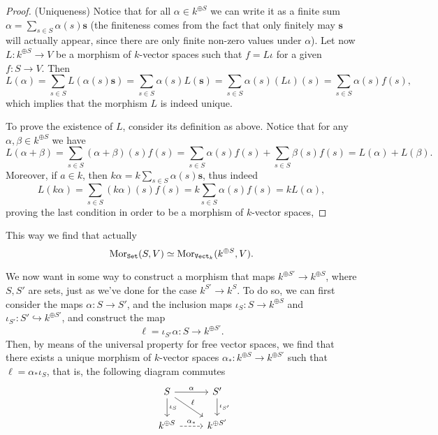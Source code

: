 \begin{proof}
(Uniqueness) Notice that for all \(\alpha \in k^{\oplus S}\) we can write it
as a finite sum \(\alpha = \sum_{s \in S}\alpha(s) \mathbf s\) (the
finiteness comes from the fact that only finitely may \(\mathbf s\) will
actually appear, since there are only finite non-zero values under
\(\alpha\)). Let now  \(L : k^{\oplus S} \to V\) be a morphism of
\(k\)-vector spaces such that \(f = L  \iota\) for a given \(f : S \to
V\). Then
\[
  L(\alpha) = \sum_{s \in S} L(\alpha(s) \mathbf{s}) = \sum_{s \in S}
  \alpha(s) L(\mathbf s) = \sum_{s \in S} \alpha(s) (L  \iota)(s)
  = \sum_{s \in S} \alpha(s) f(s),
\]
which implies that the morphism \(L\) is indeed unique.

To prove the existence of \(L\), consider its definition as above. Notice
that for any \(\alpha, \beta \in k^{\oplus S}\) we have
\[
  L(\alpha + \beta) = \sum_{s \in S} (\alpha + \beta)(s) f(s) = \sum_{s \in
  S} \alpha(s)f(s) + \sum_{s \in S} \beta(s)f(s) = L(\alpha) + L(\beta).
\]
Moreover, if \(a \in k\), then \(k \alpha = k\sum_{s \in S} \alpha(s)
\mathbf s\), thus indeed
\[
  L(k \alpha) = \sum_{s \in S} (k \alpha)(s) f(s) = k \sum_{s \in S}
  \alpha(s) f(s) = k L(\alpha),
\]
proving the last condition in order to be a morphism of \(k\)-vector spaces,
\end{proof}

This way we find that actually
\[
\operatorname{Mor}_{{\texttt{Set}}}(S, V) \simeq \operatorname{Mor}_{{\texttt{Vect}}_k}(k^{\oplus S}, V).
\]

We now want in some way to construct a morphism that maps \(k^{\oplus S'} \to
k^{\oplus S}\), where \(S, S'\) are sets, just as we've done for the case
\(k^{S'} \to k^S\). To do so, we can first consider the maps \(\alpha: S \to
S'\), and the inclusion maps \(\iota_S : S \to k^{\oplus S}\) and \(\iota_{S'} :
S' \hookrightarrow k^{\oplus S'}\), and construct the map
\[
\ell = \iota_{S'}  \alpha : S \to k^{\oplus S'}.
\]
Then, by means of the universal property for free vector spaces, we find that
there exists a unique morphism of \(k\)-vector spaces \(\alpha_\ast : k^{\oplus
S} \to k^{\oplus S'} \) such that \(\ell = \alpha_\ast  \iota_S\), that is,
the following diagram commutes
\[
\begin{tikzcd}
  &S \arrow[r, "\alpha"] \arrow[d, "\iota_S"] \arrow[dr, "\ell"]
  &S' \arrow[d, "\iota_{S'}"]
  \\
  &k^{\oplus S} \arrow[r, dashed, "\alpha_\ast"]
  &k^{\oplus S'}
\end{tikzcd}
\]

